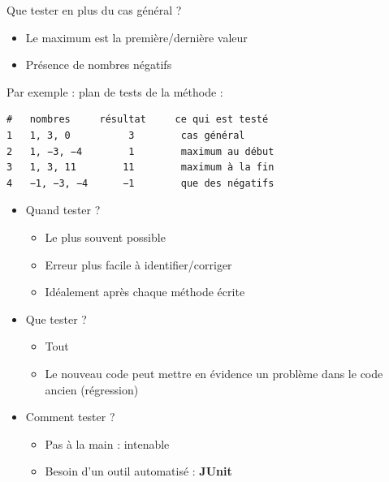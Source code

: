 \documentclass[11pt,a4paper]{article}
\begin{document}
            \par
        
          Que tester en plus du cas g\'en\'eral ?
          
					\begin{itemize}
				
			\item Le maximum est la premi\`ere/derni\`ere valeur
			\item Pr\'esence de nombres n\'egatifs
					\end{itemize}
				
            \par
        
          Par exemple : plan de tests de la m\'ethode \verb@max@ : 
        
            \par
        \begin{verbatim}
#   nombres     résultat     ce qui est testé
1   1, 3, 0          3        cas général
2   1, −3, −4        1        maximum au début
3   1, 3, 11        11        maximum à la fin
4   −1, −3, −4      −1        que des négatifs
        \end{verbatim}
					\begin{itemize}
				
			\item Quand tester ? 
              
					\begin{itemize}
				
			\item Le plus souvent possible
			\item Erreur plus facile \`a identifier/corriger
			\item Id\'ealement apr\`es chaque m\'ethode \'ecrite
					\end{itemize}
				
			\item Que tester ? 
              
					\begin{itemize}
				
			\item Tout
			\item Le nouveau code peut mettre en \'evidence un probl\`eme dans le code ancien (r\'egression)
					\end{itemize}
				
			\item Comment tester ? 
              
					\begin{itemize}
				
			\item Pas \`a la main : intenable
			\item Besoin d'un outil automatis\'e : \textbf{JUnit}
					\end{itemize}
				
					\end{itemize}
				
\end{document}
